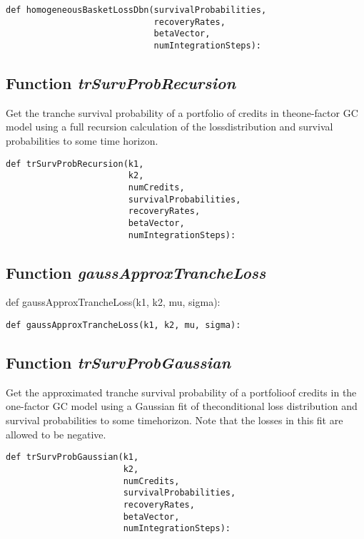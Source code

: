 \documentclass[twoside,11pt]{book}
\begin{document}
\begin{lstlisting}
def homogeneousBasketLossDbn(survivalProbabilities,
                             recoveryRates,
                             betaVector,
                             numIntegrationSteps):
\end{lstlisting}

\subsection{Function {\it trSurvProbRecursion}}
Get the tranche survival probability of a portfolio of credits in theone-factor GC model using a full recursion calculation of the lossdistribution and survival probabilities to some time horizon. 

\begin{lstlisting}
def trSurvProbRecursion(k1,
                        k2,
                        numCredits,
                        survivalProbabilities,
                        recoveryRates,
                        betaVector,
                        numIntegrationSteps):
\end{lstlisting}

\subsection{Function {\it gaussApproxTrancheLoss}}
def gaussApproxTrancheLoss(k1, k2, mu, sigma):

\begin{lstlisting}
def gaussApproxTrancheLoss(k1, k2, mu, sigma):
\end{lstlisting}

\subsection{Function {\it trSurvProbGaussian}}
Get the approximated tranche survival probability of a portfolioof credits in the one-factor GC model using a Gaussian fit of theconditional loss distribution and survival probabilities to some timehorizon. Note that the losses in this fit are allowed to be negative. 

\begin{lstlisting}
def trSurvProbGaussian(k1,
                       k2,
                       numCredits,
                       survivalProbabilities,
                       recoveryRates,
                       betaVector,
                       numIntegrationSteps):
\end{lstlisting}
\end{document}
